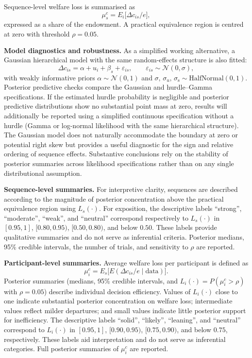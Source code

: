 \documentclass[11pt,a4paper]{article}
\numberwithin{equation}{section}
\begin{document}
Sequence-level welfare loss is summarised as
\[
\mu_s^{c} = E_i\!\big[\Delta c_{is} / e\big],
\]
expressed as a share of the endowment.  
A practical equivalence region is centred at zero with threshold $\rho = 0.05$.

\textbf{Model diagnostics and robustness.}
As a simplified working alternative, a Gaussian hierarchical model with the same 
random-effects structure is also fitted:
\[
\Delta c_{is} = \alpha + u_i + \beta_s + \varepsilon_{is},
\qquad 
\varepsilon_{is}\sim \mathcal{N}(0,\sigma),
\]
with weakly informative priors 
$\alpha\sim\mathcal{N}(0,1)$ and 
$\sigma,\,\sigma_u,\,\sigma_{\mathrm{s}}\sim\mathrm{HalfNormal}(0,1)$.
Posterior predictive checks compare the Gaussian and hurdle--Gamma specifications.  
If the estimated hurdle probability is negligible and posterior predictive
distributions show no substantial point mass at zero, results will additionally
be reported using a simplified continuous specification without a hurdle (Gamma
or log-normal likelihood with the same hierarchical structure).
The Gaussian model does not naturally accommodate the boundary at zero or
potential right skew but provides a useful diagnostic for the sign and relative
ordering of sequence effects.  
Substantive conclusions rely on the stability of posterior summaries across
likelihood specifications rather than on any single distributional assumption.

\textbf{Sequence-level summaries.}
For interpretive clarity, sequences are described according to the magnitude of 
posterior concentration above the practical equivalence region using $L_s(\cdot)$.  
For exposition, the descriptive labels \enquote{strong}, \enquote{moderate}, 
\enquote{weak}, and \enquote{neutral} correspond respectively to $L_s(\cdot)$ in 
$[0.95,1]$, $[0.80,0.95)$, $[0.50,0.80)$, and below $0.50$.  
These labels provide qualitative summaries and do not serve as inferential 
criteria. Posterior medians, 95\% credible intervals, the number of trials, and 
sensitivity to $\rho$ are reported.

\textbf{Participant-level summaries.}
Average welfare loss per participant is defined as
\[
\mu_i^{c} = E_s\!\big[E(\Delta c_{is}/e \mid \text{data})\big].
\]
Posterior summaries (medians, 95\% credible intervals, and 
$L_i(\cdot)=P(\mu_i^{c} > \rho)$ with $\rho = 0.05$) describe individual 
decision efficiency. Values of $L_i(\cdot)$ close to one indicate substantial 
posterior concentration on welfare loss; intermediate values reflect milder 
departures; and small values indicate little posterior support for inefficiency.
The descriptive labels \enquote{solid}, \enquote{likely}, \enquote{leaning}, and 
\enquote{neutral} correspond to $L_i(\cdot)$ in $[0.95,1]$, $[0.90,0.95)$, 
$[0.75,0.90)$, and below $0.75$, respectively.  
These labels aid interpretation and do not serve as inferential categories.  
Full posterior summaries of $\mu_i^{c}$ are reported.
\end{document}
